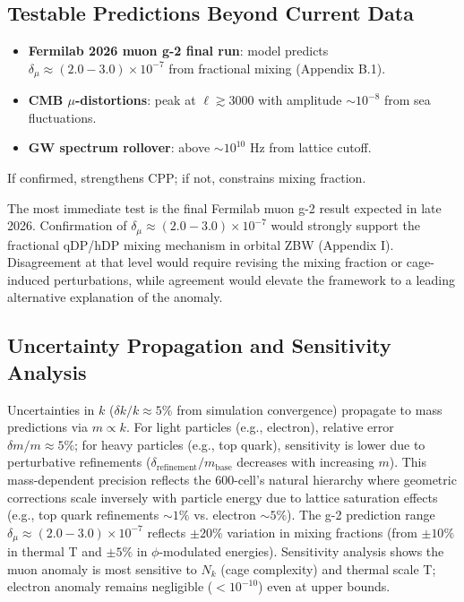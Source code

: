 \documentclass{article}
\begin{document}
\begin{landscape}
\subsection{Testable Predictions Beyond Current Data}
\begin{itemize}
\item \textbf{Fermilab 2026 muon g-2 final run}: model predicts $\delta_\mu \approx (2.0-3.0) \times 10^{-7}$ from fractional mixing (Appendix B.1).

\item \textbf{CMB $\mu$-distortions}: peak at $\ell \gtrsim 3000$ with amplitude $\sim 10^{-8}$ from sea fluctuations.

\item \textbf{GW spectrum rollover}: above $\sim 10^{10}$ Hz from lattice cutoff.
\end{itemize}

If confirmed, strengthens CPP; if not, constrains mixing fraction.

The most immediate test is the final Fermilab muon g-2 result expected in late 2026. Confirmation of $\delta_\mu \approx (2.0-3.0) \times 10^{-7}$ would strongly support the fractional qDP/hDP mixing mechanism in orbital ZBW (Appendix I). Disagreement at that level would require revising the mixing fraction or cage-induced perturbations, while agreement would elevate the framework to a leading alternative explanation of the anomaly.

\subsection{Uncertainty Propagation and Sensitivity Analysis}

Uncertainties in $k$ ($\delta k / k \approx 5\%$ from simulation convergence) propagate to mass predictions via $m \propto k$. For light particles (e.g., electron), relative error $\delta m / m \approx 5\%$; for heavy particles (e.g., top quark), sensitivity is lower due to perturbative refinements ($\delta_{\text{refinement}} / m_{\text{base}}$ decreases with increasing $m$). This mass-dependent precision reflects the 600-cell's natural hierarchy where geometric corrections scale inversely with particle energy due to lattice saturation effects (e.g., top quark refinements $\sim 1\%$ vs. electron $\sim 5\%$). The g-2 prediction range $\delta_\mu \approx (2.0-3.0) \times 10^{-7}$ reflects $\pm 20\%$ variation in mixing fractions (from $\pm 10\%$ in thermal T and $\pm 5\%$ in $\phi$-modulated energies). Sensitivity analysis shows the muon anomaly is most sensitive to $N_k$ (cage complexity) and thermal scale T; electron anomaly remains negligible ($<10^{-10}$) even at upper bounds.


\end{landscape}
\end{document}
